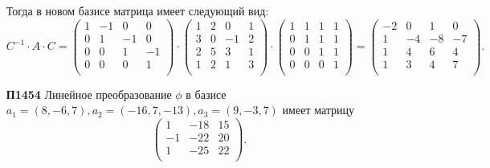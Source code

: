 \documentclass[a4paper]{article}
\begin{document}
\begin{enumerate}
\begin{options}
\begin{solution}
                Тогда в новом базисе матрица имеет следующий вид:
                \begin{equation*}
                    C^{-1} \cdot A \cdot C = 
                    \begin{pmatrix}
                        1 & -1 & 0 & 0 \\
                        0 & 1 & -1 & 0 \\
                        0 & 0 & 1 & -1 \\
                        0 & 0 & 0 & 1 \\
                    \end{pmatrix}
                    \cdot
                    \begin{pmatrix}
                        1 & 2 & 0 & 1 \\
                        3 & 0 & -1 & 2 \\
                        2 & 5 & 3 & 1 \\
                        1 & 2 & 1 & 3 \\
                    \end{pmatrix}
                    \cdot
                    \begin{pmatrix}
                        1 & 1 & 1 & 1 \\
                        0 & 1 & 1 & 1 \\
                        0 & 0 & 1 & 1 \\
                        0 & 0 & 0 & 1 \\
                    \end{pmatrix}
                    =
                    \begin{pmatrix}
                        -2 & 0 & 1 & 0 \\
                        1 & -4 & -8 & -7 \\
                        1 & 4 & 6 & 4 \\
                        1 & 3 & 4 & 7 \\
                    \end{pmatrix}.
                \end{equation*}
            \end{solution}
        \end{options}

    \item[\textbf{П1454}]
        Линейное преобразование $\phi$ в базисе $a_1 = (8, -6, 7), a_2 = (-16, 7, -13), a_3 = (9, -3, 7)$ имеет матрицу
        \begin{equation*}
            \begin{pmatrix}
                1 & -18 & 15 \\
                -1 & -22 & 20 \\
                1 & -25 & 22 \\
            \end{pmatrix}.
        \end{equation*}


\end{enumerate}
\end{document}
